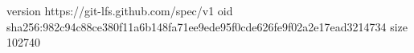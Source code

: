 version https://git-lfs.github.com/spec/v1
oid sha256:982c94c88ce380f11a6b148fa71ee9ede95f0cde626fe9f02a2e17ead3214734
size 102740
